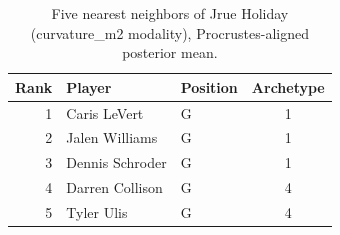 \begin{table}[htbp]
  \centering\small
  \begin{tabular}{rllc}
    \toprule
    Rank & Player & Position & Archetype \\
    \midrule
    1 & Caris LeVert & G & 1 \\
    2 & Jalen Williams & G & 1 \\
    3 & Dennis Schroder & G & 1 \\
    4 & Darren Collison & G & 4 \\
    5 & Tyler Ulis & G & 4 \\
    \bottomrule
  \end{tabular}
  \caption{Five nearest neighbors of Jrue Holiday (curvature_m2 modality), Procrustes-aligned posterior mean.}
  \label{tab:Jrue_Holiday_neighbors_curvature_m2}
\end{table}

